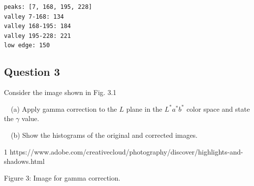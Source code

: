 \documentclass[10pt]{article}
\begin{document}
    \begin{Verbatim}[commandchars=\\\{\}]
peaks: [7, 168, 195, 228]
valley 7-168: 134
valley 168-195: 184
valley 195-228: 221
low edge: 150
    \end{Verbatim}

    \begin{center}
    \end{center}
    
    \begin{center}
    \end{center}
    

\subsection{Question 3}\label{question-3}

Consider the image shown in Fig. 3.1

~~(a) Apply gamma correction to the \(L\) plane in the \(L^*a^*b^*\)
color space and state the \(\gamma\) value.

~~(b) Show the histograms of the original and corrected images.

1
https://www.adobe.com/creativecloud/photography/discover/highlights-and-shadows.html

Figure 3: Image for gamma correction.
\end{document}
